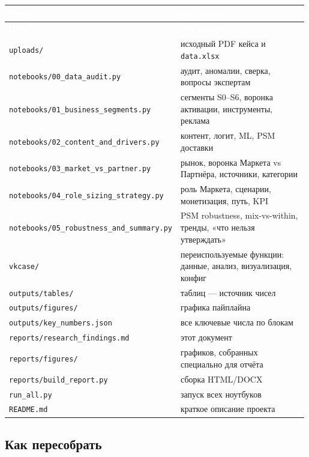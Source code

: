 \documentclass[10pt,a4paper]{article}
\begin{document}
\begingroup
\small
\setlength{\tabcolsep}{3pt}
\renewcommand{\arraystretch}{1.12}
\begin{longtable}{@{}>{\raggedright\arraybackslash}p{0.4468\linewidth}>{\raggedright\arraybackslash}p{0.5409\linewidth}@{}}
\rowcolor{blue}
\textcolor{white}{\textbf{Путь}} & \textcolor{white}{\textbf{Что внутри}} \\
\endfirsthead
\rowcolor{blue}
\textcolor{white}{\textbf{Путь}} & \textcolor{white}{\textbf{Что внутри}} \\
\endhead
\hline
\texttt{uploads/} & исходный PDF кейса и \texttt{data.xlsx} \\
\texttt{notebooks/00\_data\_audit.py} & аудит, аномалии, сверка, вопросы экспертам \\
\texttt{notebooks/01\_business\_segments.py} & сегменты S0–S6, воронка активации, инструменты, реклама \\
\texttt{notebooks/02\_content\_and\_drivers.py} & контент, логит, ML, PSM доставки \\
\texttt{notebooks/03\_market\_vs\_partner.py} & рынок, воронка Маркета vs Партнёра, источники, категории \\
\texttt{notebooks/04\_role\_sizing\_strategy.py} & роль Маркета, сценарии, монетизация, путь, KPI \\
\texttt{notebooks/05\_robustness\_and\_summary.py} & PSM robustness, mix-vs-within, тренды, «что нельзя утверждать» \\
\texttt{vkcase/} & переиспользуемые функции: данные, анализ, визуализация, конфиг \\
\texttt{outputs/tables/} & 60 таблиц — источник чисел \\
\texttt{outputs/figures/} & 24 графика пайплайна \\
\texttt{outputs/key\_numbers.json} & все ключевые числа по блокам \\
\texttt{reports/research\_findings.md} & этот документ \\
\texttt{reports/figures/} & 7 графиков, собранных специально для отчёта \\
\texttt{reports/build\_report.py} & сборка HTML/DOCX \\
\texttt{run\_all.py} & запуск всех ноутбуков \\
\texttt{README.md} & краткое описание проекта \\
\hline
\end{longtable}
\endgroup
\vspace{4pt}

\subsection{Как пересобрать}
\end{document}

